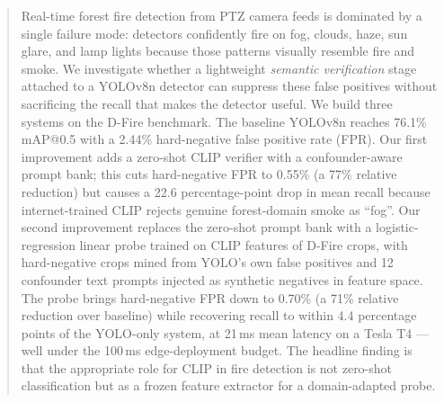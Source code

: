 \documentclass{article}
\begin{document}

\begin{abstract}
Real-time forest fire detection from PTZ camera feeds is dominated by a single
failure mode: detectors confidently fire on fog, clouds, haze, sun glare, and
lamp lights because those patterns visually resemble fire and smoke. We
investigate whether a lightweight \emph{semantic verification} stage attached
to a YOLOv8n detector can suppress these false positives without sacrificing
the recall that makes the detector useful. We build three systems on the D-Fire
benchmark. The baseline YOLOv8n reaches 76.1\% mAP@0.5 with a 2.44\%
hard-negative false positive rate (FPR). Our first improvement adds a
zero-shot CLIP verifier with a confounder-aware prompt bank; this cuts
hard-negative FPR to 0.55\% (a 77\% relative reduction) but causes a 22.6
percentage-point drop in mean recall because internet-trained CLIP rejects
genuine forest-domain smoke as ``fog''. Our second improvement replaces the
zero-shot prompt bank with a logistic-regression linear probe trained on
CLIP features of D-Fire crops, with hard-negative crops mined from YOLO's own
false positives and 12 confounder text prompts injected as synthetic negatives
in feature space. The probe brings hard-negative FPR down to 0.70\% (a 71\%
relative reduction over baseline) while recovering recall to within 4.4
percentage points of the YOLO-only system, at 21\,ms mean latency on a Tesla T4
--- well under the 100\,ms edge-deployment budget. The headline finding is that
the appropriate role for CLIP in fire detection is not zero-shot
classification but as a frozen feature extractor for a domain-adapted probe.
\end{abstract}
\end{document}
